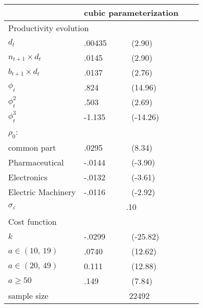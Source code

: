 
\begin{tabular}{lllll}
\hline \hline 
 & \multicolumn{2}{c}{cubic parameterization}\\
\hline
\multicolumn{5}{l}{Productivity evolution}\\
$d_t$                    & .00435\sym{**}  & (2.90) \\
$n_{t+1} \times d_t$     &  .0145\sym{**} & (2.90) \\
$b_{t+1} \times d_t $     & .0137\sym{*} & (2.76) \\
$\phi_{t}$             & .824\sym{**}  & (14.96)  \\
$\phi_{t}^{2}$         & .503\sym{**} & (2.69)  \\
$\phi_{t}^{3}$         & -1.135\sym{**}& (-14.26)\\
$\rho_{0}$:               &  &  &  & \\
\hline
common part               &.0295\sym{**} & (8.34) \\
Pharmaceutical            & -.0144\sym{*}&(-3.90) \\
Electronics               & -.0132\sym{**} &(-3.61)\\
Electric Machinery       & -.0116\sym{**} &(-2.92) \\ 
$\sigma_{\varepsilon}$ & \multicolumn{2}{c}{.10} \\
\multicolumn{5}{l}{Cost function} \\
$k$                      & -.0299\sym{**}& (-25.82)   \\       
$a\in\left(10,\,19\right)$  & .0740\sym{**} &(12.62)\\
$a\in\left(20,\,49\right)$  & 0.111\sym{**}&(12.88)   \\
$a\geq50$                &.149\sym{**}  & (7.84) \\
\hline                
sample size & \multicolumn{4}{c}{22492}\tabularnewline
\hline\hline
\end{tabular}

